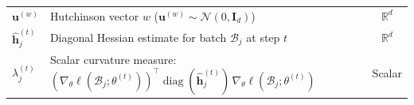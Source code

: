 \begin{table}[H]
\begin{tabularx}{0.85\linewidth}{lXc}
$\mathbf{u}^{(w)}$ & Hutchinson vector $w$ ($\mathbf{u}^{(w)} \sim \mathcal{N}(0, \mathbf{I}_d)$) & $\mathbb{R}^d$ \\
$\hat{\mathbf{h}}^{(t)}_j$ & Diagonal Hessian estimate for batch $\mathcal{B}_j$ at step $t$ & $\mathbb{R}^d$ \\
$\lambda_j^{(t)}$ & Scalar curvature measure: $(\nabla_\theta \ell(\mathcal{B}_j; \theta^{(t)}))^\top \operatorname{diag}(\hat{\mathbf{h}}^{(t)}_j) \, \nabla_\theta \ell(\mathcal{B}_j; \theta^{(t)})$ & Scalar \\
\bottomrule
\end{tabularx}
\end{table}